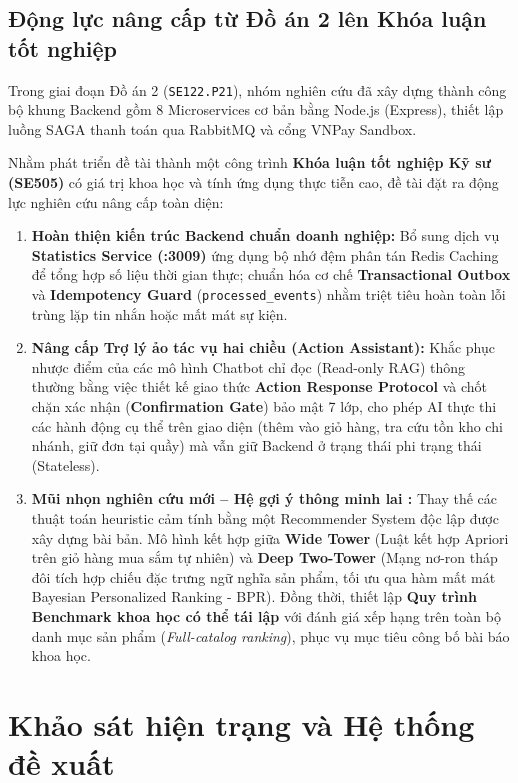 \documentclass[12pt,a4paper]{report}
\begin{document}
\subsection{Động lực nâng cấp từ Đồ án 2 lên Khóa luận tốt nghiệp}
Trong giai đoạn Đồ án 2 (\texttt{SE122.P21}), nhóm nghiên cứu đã xây dựng thành công bộ khung Backend gồm 8 Microservices cơ bản bằng Node.js (Express), thiết lập luồng SAGA thanh toán qua RabbitMQ và cổng VNPay Sandbox.

Nhằm phát triển đề tài thành một công trình \textbf{Khóa luận tốt nghiệp Kỹ sư (SE505)} có giá trị khoa học và tính ứng dụng thực tiễn cao, đề tài đặt ra động lực nghiên cứu nâng cấp toàn diện:
\begin{enumerate}
    \item \textbf{Hoàn thiện kiến trúc Backend chuẩn doanh nghiệp:} Bổ sung dịch vụ \textbf{Statistics Service (:3009)} ứng dụng bộ nhớ đệm phân tán Redis Caching để tổng hợp số liệu thời gian thực; chuẩn hóa cơ chế \textbf{Transactional Outbox} và \textbf{Idempotency Guard} (\texttt{processed\_events}) nhằm triệt tiêu hoàn toàn lỗi trùng lặp tin nhắn hoặc mất mát sự kiện.
    \item \textbf{Nâng cấp Trợ lý ảo tác vụ hai chiều (Action Assistant):} Khắc phục nhược điểm của các mô hình Chatbot chỉ đọc (Read-only RAG) thông thường bằng việc thiết kế giao thức \textbf{Action Response Protocol} và chốt chặn xác nhận (\textbf{Confirmation Gate}) bảo mật 7 lớp, cho phép AI thực thi các hành động cụ thể trên giao diện (thêm vào giỏ hàng, tra cứu tồn kho chi nhánh, giữ đơn tại quầy) mà vẫn giữ Backend ở trạng thái phi trạng thái (Stateless).
    \item \textbf{Mũi nhọn nghiên cứu mới -- Hệ gợi ý thông minh lai :} Thay thế các thuật toán heuristic cảm tính bằng một Recommender System độc lập được xây dựng bài bản. Mô hình kết hợp giữa \textbf{Wide Tower} (Luật kết hợp Apriori trên giỏ hàng mua sắm tự nhiên) và \textbf{Deep Two-Tower} (Mạng nơ-ron tháp đôi tích hợp chiếu đặc trưng ngữ nghĩa sản phẩm, tối ưu qua hàm mất mát Bayesian Personalized Ranking - BPR). Đồng thời, thiết lập \textbf{Quy trình Benchmark khoa học có thể tái lập} với đánh giá xếp hạng trên toàn bộ danh mục sản phẩm (\textit{Full-catalog ranking}), phục vụ mục tiêu công bố bài báo khoa học.
\end{enumerate}

\section{Khảo sát hiện trạng và Hệ thống đề xuất}
\end{document}
